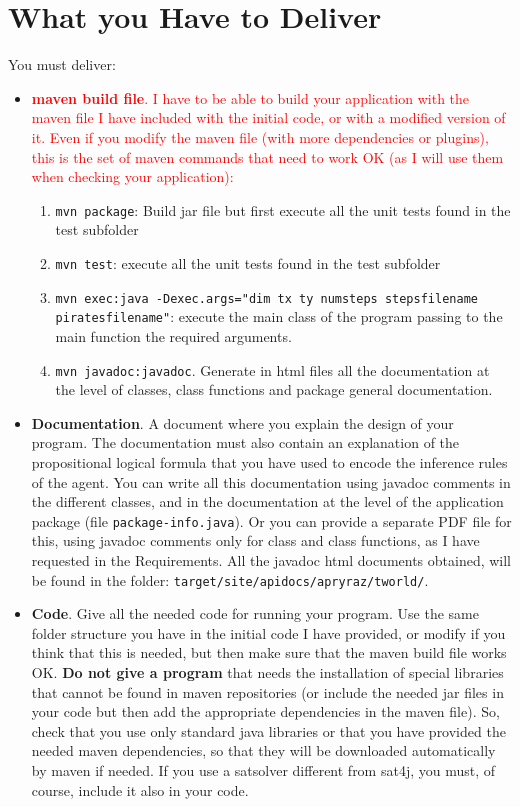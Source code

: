 \documentclass{tufte-handout}
\begin{document}
\section{What you Have to Deliver}

\begin{fullwidth}
You must deliver:
\begin{itemize}
\item  \textcolor{red}{{\bf maven build file}. I have to be able to build your
 application with the maven file I have included with the initial
 code, or with a modified version of it. Even if you modify the maven
 file (with more dependencies or plugins), this is the set of maven commands that
 need to work OK (as I will use them when checking your application):}
\begin{enumerate}
  \item {\tt mvn package}: Build jar file but first execute all the unit tests found in the test
  subfolder
   \item {\tt mvn test}: execute all the unit tests found in the test
   subfolder
  \item {\tt mvn exec:java -Dexec.args="dim tx ty numsteps stepsfilename piratesfilename"}: execute the main
  class of the program passing to the main function the required arguments.
  \item {\tt mvn javadoc:javadoc}. Generate in html files all the documentation at the level
  of classes, class functions and package general documentation.
\end{enumerate}
\item {\bf Documentation}. A document where you explain the
design of your program.
The documentation must also contain an explanation of the
propositional logical formula  that you have used to
encode the inference rules of the agent. You can write all this
documentation using javadoc comments in the different classes, and in the
documentation at the level of the application package (file {\tt package-info.java}).
Or you can provide a separate PDF file for this, using javadoc comments
only for class and class functions, as I have requested in the Requirements.
All the javadoc html documents obtained, will be found in the folder:
{\tt target/site/apidocs/apryraz/tworld/}.
\item {\bf Code}. Give all the needed code for running your
program. Use the same folder structure you have in the initial code I have provided,
or modify if you think that this is needed, but then make sure that the maven build file works
OK. {\bf Do not give a program} that needs the installation of
special  libraries that cannot be found in maven repositories (or include
the needed jar files in your code but then add the appropriate dependencies in the
maven file). So, check that you use only standard  java libraries  or that you have
 provided the needed maven dependencies, so that they will be downloaded
automatically by maven if needed.
If you use a satsolver different from sat4j, you must, of course, include it also in
your code.
\end{itemize}
\end{fullwidth}
\end{document}
